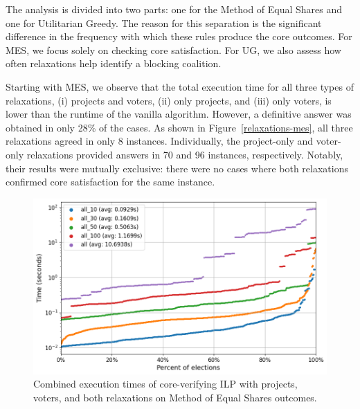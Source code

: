 \documentclass[magisterska,en]{pracamgr}
\newcommand\chartsize{0.94}
\begin{document}
The analysis is divided into two parts: one for the Method of Equal Shares and one for Utilitarian Greedy. The reason for this separation is the significant difference in the frequency with which these rules produce the core outcomes. For MES, we focus solely on checking core satisfaction. For UG, we also assess how often relaxations help identify a blocking coalition.

Starting with MES, we observe that the total execution time for all three types of relaxations, (i) projects and voters, (ii) only projects, and (iii) only voters, is lower than the runtime of the vanilla algorithm. However, a definitive answer was obtained in only 28\% of the cases. As shown in Figure~\ref{relaxations-mes}, all three relaxations agreed in only 8 instances. Individually, the project-only and voter-only relaxations provided answers in 70 and 96 instances, respectively. Notably, their results were mutually exclusive: there were no cases where both relaxations confirmed core satisfaction for the same instance.

\begin{figure}[h!]
    \centering
    \includegraphics[width=\chartsize\linewidth]{outputs/Relaxations/mes.png}
    \caption{Combined execution times of core-verifying ILP with projects, voters, and both relaxations on Method of Equal Shares outcomes.}
    \label{relaxations-mes-time}
\end{figure}
\end{document}

